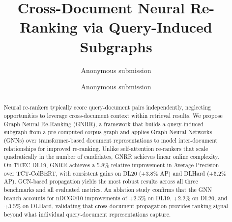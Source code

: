 \documentclass[runningheads]{llncs}
\title{Cross-Document Neural Re-Ranking via Query-Induced Subgraphs}
\author{Anonymous submission}
\institute{}
\newcommand{\ModelName}{\textsc{GNRR}\xspace}
\begin{document}
\maketitle

\author{Anonymous submission}
\institute{}

%

\begin{abstract}
Neural re-rankers typically score query-document pairs independently, neglecting opportunities to leverage cross-document context within retrieval results.
We propose Graph Neural Re-Ranking (\ModelName), a framework that builds a query-induced subgraph from a pre-computed corpus graph and applies Graph Neural Networks (GNNs) over transformer-based document representations to model inter-document relationships for improved re-ranking.
Unlike self-attention re-rankers that scale quadratically in the number of candidates, \ModelName achieves linear online complexity.
On TREC-DL19, \ModelName achieves a 5.8\% relative improvement in Average Precision over TCT-ColBERT, with consistent gains on DL20 (+3.8\% AP) and DLHard (+5.2\% AP).
GCN-based propagation yields the most robust results across all three benchmarks and all evaluated metrics.
An ablation study confirms that the GNN branch accounts for nDCG@10 improvements of +2.5\% on DL19, +2.2\% on DL20, and
+3.5\% on DLHard, validating that cross-document propagation provides ranking signal beyond what individual query-document
representations capture.
\end{abstract}

\end{document}
